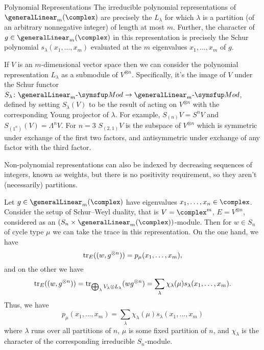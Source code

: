 \begin{thm}{Polynomial Representations}{}
    The irreducible polynomial representations of \(\generalLinear_m(\complex)\) are precisely the \(L_\lambda\) for which \(\lambda\) is a partition (of an arbitrary nonnegative integer) of length at most \(m\).
    Further, the character of \(g \in \generalLinear_m(\complex)\) in this representation is precisely the Schur polynomial \(s_\lambda(x_1, \dotsc, x_m)\) evaluated at the \(m\) eigenvalues \(x_1, \dotsc, x_m\) of \(g\).
\end{thm}

If \(V\) is an \(m\)-dimensional vector space then we can consider the polynomial representation \(L_\lambda\) as a submodule of \(V^{\otimes n}\).
Specifically, it's the image of \(V\) under the Schur functor \(S_\lambda \colon \AMod[\generalLinear_m] \to \AMod[\generalLinear_m]\), defined by setting \(S_\lambda(V)\) to be the result of acting on \(V^{\otimes n}\) with the corresponding Young projector of \(\lambda\).
For example, \(S_{(n)} V = S^n V\) and \(S_{(1^n)}(V) = \Lambda^nV\).
For \(n = 3\) \(S_{(2,1)}V\) is the subspace of \(V^{\otimes n}\) which is symmetric under exchange of the first two factors, and antisymmetric under exchange of any factor with the third factor.

Non-polynomial representations can also be indexed by decreasing sequences of integers, known as weights, but there is no positivity requirement, so they aren't (necessarily) partitions.

Let \(g \in \generalLinear_m(\complex)\) have eigenvalues \(x_1, \dotsc, x_n \in \complex\).
Consider the setup of Schur--Weyl duality, that is \(V = \complex^m\), \(E = V^{\otimes n}\), considered as an \((S_n \times \generalLinear_m(\complex))\)-module.
Then for \(w \in S_n\) of cycle type \(\mu\) we can take the trace in this representation.
On the one hand, we have
\begin{equation}
    \operatorname{tr}_E((w, g^{\otimes n})) = p_\mu(x_1, \dotsc, x_m),
\end{equation}
and on the other we have
\begin{equation}
    \operatorname{tr}_E((w, g^{\otimes n})) = \operatorname{tr}_{\bigoplus_\lambda V_\lambda \otimes L_\lambda}(wg^{\otimes n}) = \sum_\lambda \chi_\lambda(\mu) s_\lambda(x_1, \dotsc, x_m).
\end{equation}
Thus, we have
\begin{equation}
    p_\mu(x_1, \dotsc, x_m) = \sum_{\lambda} \chi_\lambda(\mu) s_\lambda(x_1, \dotsc, x_m)
\end{equation}
where \(\lambda\) runs over all partitions of \(n\), \(\mu\) is some fixed partition of \(n\), and \(\chi_\lambda\) is the character of the corresponding irreducible \(S_n\)-module.

